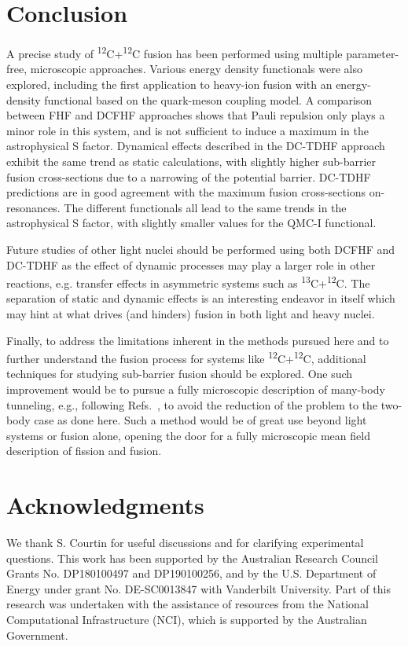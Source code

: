 \section{Conclusion}
\label{cc:sec:conclusion}
A precise study of \textsuperscript{12}C+\textsuperscript{12}C fusion has been performed using multiple parameter-free, microscopic approaches. 
Various energy density functionals were also explored, including the first application to heavy-ion fusion with an energy-density functional based on the quark-meson coupling model.
A comparison between FHF and DCFHF approaches shows that Pauli repulsion only plays a minor role in this system, and is not sufficient to induce a maximum in the astrophysical S factor. 
Dynamical effects described in the DC-TDHF approach exhibit the same trend as static calculations, with slightly higher sub-barrier fusion cross-sections due to a narrowing of the potential barrier. 
DC-TDHF predictions are in good agreement with the maximum fusion cross-sections on-resonances. 
The different functionals all lead to the same trends in the astrophysical S factor, with slightly smaller values for the QMC-I functional. 

Future studies of other light nuclei should be performed using both DCFHF and DC-TDHF as the effect of dynamic processes may play a larger role in other reactions, e.g. transfer effects in asymmetric systems such as \textsuperscript{13}C+\textsuperscript{12}C. 
The separation of static and dynamic effects is an interesting endeavor in itself which may hint at what drives (and hinders) fusion in both light and heavy nuclei.

Finally, to address the limitations inherent in the methods pursued here and to further understand the fusion process for systems like \textsuperscript{12}C+\textsuperscript{12}C, additional techniques for studying sub-barrier fusion should be explored.
One such improvement would be to pursue a fully microscopic description of many-body tunneling, e.g., following Refs.~\protect\citep{levit1980c,reinhardt1980}, 
to avoid the reduction of the problem to the two-body case as done here.
Such a method would be of great use beyond light systems or fusion alone, opening the door for a fully microscopic mean field description of fission and fusion.



\section{Acknowledgments}
We thank S. Courtin for useful discussions and for clarifying experimental questions. 
This work has been supported by the
Australian Research Council Grants No. DP180100497 and DP190100256,
and by the U.S. Department of Energy under grant No.
DE-SC0013847 with Vanderbilt University.
Part of this research was undertaken with the assistance of resources
from the National Computational Infrastructure (NCI), which is supported by the Australian Government.

\clearpage

